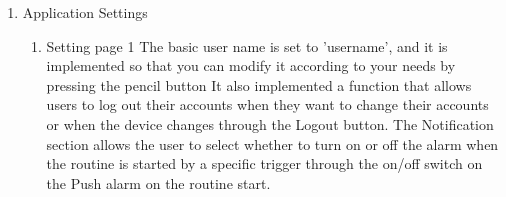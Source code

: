 \begin{enumerate}[label=\arabic*.]
\begin{enumerate}[label*={\arabic*.},ref=\theenumi.\arabic*]
                    \newpage
          \end{enumerate}
    \clearpage
    \item {\large{Application Settings}}\\
          \begin{enumerate}[label*={\arabic*.},ref=\theenumi.\arabic*]
              \setlength{\itemindent}{0.5cm}
              \item Setting page 1
                    The basic user name is set to 'username', and it is implemented so that you can modify it according to your needs by pressing the pencil button It also implemented a function that allows users to log out their accounts when they want to change their accounts or when the device changes through the Logout button. The Notification section allows the user to select whether to turn on or off the alarm when the routine is started by a specific trigger through the on/off switch on the Push alarm on the routine start. \\\\

\end{enumerate}
\end{enumerate}
